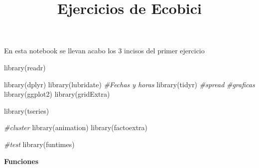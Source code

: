 \documentclass[
]{article}
\title{Ejercicios de Ecobici}
\author{}
\date{\vspace{-2.5em}}
\newenvironment{Shaded}{\begin{snugshade}}{\end{snugshade}}
\newcommand{\CommentTok}[1]{\textcolor[rgb]{0.56,0.35,0.01}{\textit{#1}}}
\newcommand{\FunctionTok}[1]{\textcolor[rgb]{0.00,0.00,0.00}{#1}}
\newcommand{\NormalTok}[1]{#1}
\begin{document}
\maketitle

En esta notebook se llevan acabo los 3 incisos del primer ejercicio

\begin{Shaded}
\begin{Highlighting}[]
\FunctionTok{library}\NormalTok{(readr)}

\FunctionTok{library}\NormalTok{(dplyr)}
\FunctionTok{library}\NormalTok{(lubridate) }\CommentTok{\#Fechas y horas}
\FunctionTok{library}\NormalTok{(tidyr) }\CommentTok{\#spread }
\CommentTok{\#graficas}
\FunctionTok{library}\NormalTok{(ggplot2)}
\FunctionTok{library}\NormalTok{(gridExtra)}

\FunctionTok{library}\NormalTok{(tseries)}

\CommentTok{\#cluster}
\FunctionTok{library}\NormalTok{(animation)}
\FunctionTok{library}\NormalTok{(factoextra)}

\CommentTok{\#test}
\FunctionTok{library}\NormalTok{(funtimes)}
\end{Highlighting}
\end{Shaded}

\textbf{Funciones}
\end{document}

